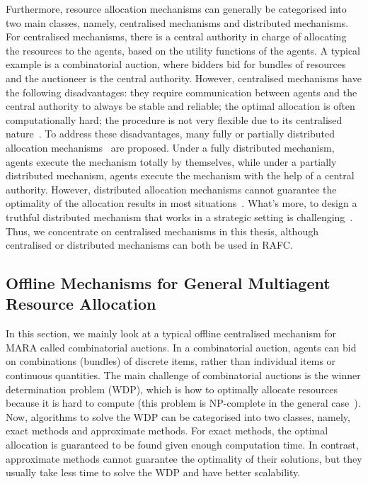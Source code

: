 \documentclass[11pt]{phdthesis}
\begin{document}
Furthermore, resource allocation mechanisms can generally be categorised into two main classes, namely, centralised mechanisms and distributed mechanisms. For centralised mechanisms, there is a central authority in charge of allocating the resources to the agents, based on the utility functions of the agents. A typical example is a combinatorial auction, where bidders bid for bundles of resources and the auctioneer is the central authority. However, centralised mechanisms have the following disadvantages: they require communication between agents and the central authority to always be stable and reliable; the optimal allocation is often computationally hard; the procedure is not very flexible due to its centralised nature~\citep{friedlander1982decentralized}.  To address these disadvantages, many fully or partially distributed allocation mechanisms~\citep{herreiner2002simple,bouveret2011general} are proposed. Under a fully distributed mechanism, agents execute the mechanism totally by themselves, while under a partially distributed mechanism, agents execute the mechanism with the help of a central authority. However, distributed allocation mechanisms cannot guarantee the optimality of the allocation results in most situations~\citep{rothe2015economics}. What's more, to design a truthful distributed mechanism that works in a strategic setting is challenging~\citep{feigenbaum2004distributed}. Thus, we concentrate on centralised mechanisms in this thesis, although centralised or distributed mechanisms can both be used in RAFC.


\subsection{Offline Mechanisms for General Multiagent Resource Allocation}

In this section, we mainly look at a typical offline centralised mechanism for MARA called combinatorial auctions. In a combinatorial auction, agents can bid on combinations (bundles) of discrete items, rather than individual items or continuous quantities. The main challenge of combinatorial auctions is the winner determination problem (WDP), which is how to optimally allocate resources because it is hard to compute (this problem is NP-complete in the general case~\citep{sandholm2002winner}). Now, algorithms to solve the WDP can be categorised into two classes, namely, exact methods and approximate methods. For exact methods, the optimal allocation is guaranteed to be found given enough computation time. In contrast, approximate methods cannot guarantee the optimality of their solutions, but they usually take less time to solve the WDP and have better scalability.
\end{document}
